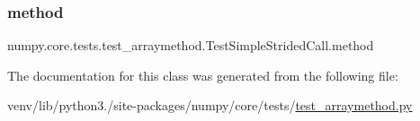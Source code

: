 \subsubsection{\texorpdfstring{method}{method}}
{\footnotesize\ttfamily numpy.\+core.\+tests.\+test\+\_\+arraymethod.\+Test\+Simple\+Strided\+Call.\+method\hspace{0.3cm}{\ttfamily [static]}}



The documentation for this class was generated from the following file\+:\begin{DoxyCompactItemize}
\item 
venv/lib/python3./site-\/packages/numpy/core/tests/\hyperlink{test__arraymethod_8py}{test\+\_\+arraymethod.\+py}\end{DoxyCompactItemize}
